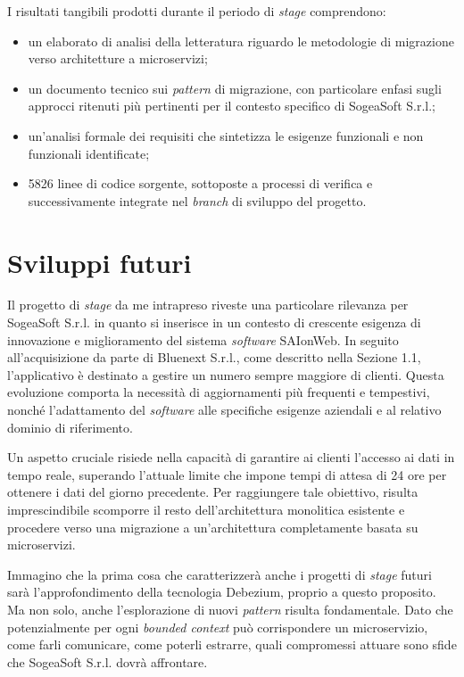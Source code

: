         \vspace{0.2 em}
        \noindent I risultati tangibili prodotti durante il periodo di \textit{stage} comprendono:
        \begin{itemize}
            \item un elaborato di analisi della letteratura riguardo le metodologie di migrazione verso architetture a microservizi;
            \item un documento tecnico sui \textit{pattern} di migrazione, con particolare enfasi sugli approcci ritenuti più pertinenti per il contesto specifico di SogeaSoft S.r.l.;
            \item un'analisi formale dei requisiti che sintetizza le esigenze funzionali e non funzionali identificate;
            \item 5826 linee di codice sorgente, sottoposte a processi di verifica e successivamente integrate nel \textit{branch} di sviluppo del progetto.
        \end{itemize}
        
    \section{Sviluppi futuri}
    Il progetto di \textit{stage} da me intrapreso riveste una particolare rilevanza per SogeaSoft S.r.l. in quanto si inserisce in un contesto di crescente esigenza di innovazione e miglioramento del sistema \textit{software} SAIonWeb. In seguito all'acquisizione da parte di Bluenext S.r.l., come descritto nella Sezione 1.1, l'applicativo è destinato a gestire un numero sempre maggiore di clienti. Questa evoluzione comporta la necessità di aggiornamenti più frequenti e tempestivi, nonché l'adattamento del \textit{software} alle specifiche esigenze aziendali e al relativo dominio di riferimento.  

    \vspace{0.2 em}
    \noindent Un aspetto cruciale risiede nella capacità di garantire ai clienti l'accesso ai dati in tempo reale, superando l'attuale limite che impone tempi di attesa di 24 ore per ottenere i dati del giorno precedente. Per raggiungere tale obiettivo, risulta imprescindibile scomporre il resto dell'architettura monolitica esistente e procedere verso una migrazione a un'architettura completamente basata su microservizi.  

    \vspace{0.2 em}
    \noindent Immagino che la prima cosa che caratterizzerà anche i progetti di \textit{stage} futuri sarà l'approfondimento della tecnologia Debezium, proprio a questo proposito. Ma non solo, anche l'esplorazione di nuovi \textit{pattern} risulta fondamentale. Dato che potenzialmente per ogni \textit{bounded context} può corrispondere un microservizio, come farli comunicare, come poterli estrarre, quali compromessi attuare sono sfide che SogeaSoft S.r.l. dovrà affrontare. 

